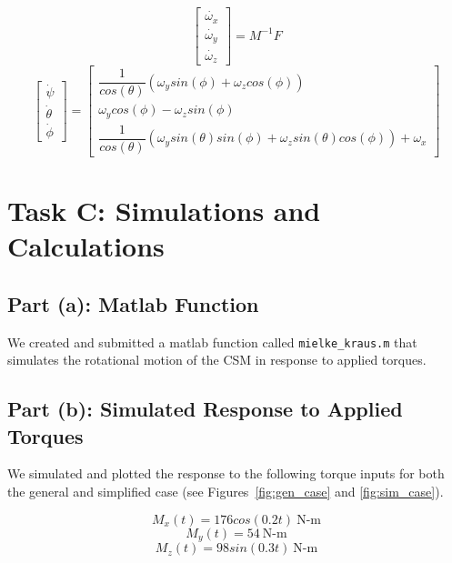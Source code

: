 \documentclass{article}
\begin{document}
\begin{equation}
\begin{bmatrix}
\dot{\omega_x} \\
\dot{\omega_y} \\
\dot{\omega_z}
\end{bmatrix}=
M^{-1}F
\end{equation}
\begin{equation}\label{eq:euler_dot}
\begin{bmatrix}
\dot{\psi} \\
\dot{\theta} \\
\dot{\phi}
\end{bmatrix}=
\begin{bmatrix}
\dfrac{1}{cos(\theta)}(\omega_y sin(\phi) + \omega_z cos(\phi)) \\
\omega_y cos(\phi) - \omega_z sin(\phi) \\
\dfrac{1}{cos(\theta)} (\omega_y sin(\theta) sin(\phi) + \omega_z sin(\theta) cos(\phi)) + \omega_x
\end{bmatrix}
\end{equation}

\section{Task C: Simulations and Calculations}
\subsection{Part (a): Matlab Function}
We created and submitted a matlab function called \verb|mielke_kraus.m| that simulates the rotational motion of the CSM in response to applied torques.

\subsection{Part (b): Simulated Response to Applied Torques}
We simulated and plotted the response to the following torque inputs for both the general and simplified case (see Figures~\ref{fig:gen_case} and \ref{fig:sim_case}).

\begin{equation}\label{eq:Mx_app}
M_x(t) = 176 cos(0.2 t)  \:\text{N-m}
\end{equation}
\begin{equation}
M_y(t) = 54  \:\text{N-m}
\end{equation}
\begin{equation}\label{eq:Mz_app}
M_z(t) = 98 sin(0.3 t)  \:\text{N-m}
\end{equation}
\end{document}
